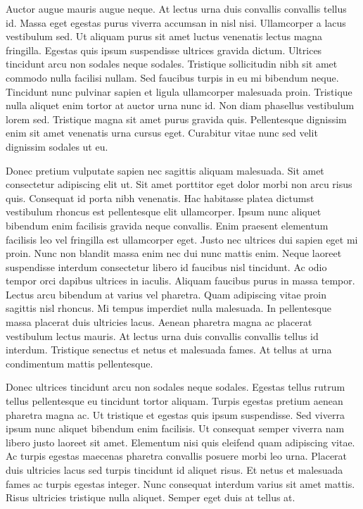 \documentclass[11pt,a4paper]{article}
\begin{document}
Auctor augue mauris augue neque. At lectus urna duis convallis convallis tellus id. Massa eget egestas purus viverra accumsan in nisl nisi. Ullamcorper a lacus vestibulum sed. Ut aliquam purus sit amet luctus venenatis lectus magna fringilla. Egestas quis ipsum suspendisse ultrices gravida dictum. Ultrices tincidunt arcu non sodales neque sodales. Tristique sollicitudin nibh sit amet commodo nulla facilisi nullam. Sed faucibus turpis in eu mi bibendum neque. Tincidunt nunc pulvinar sapien et ligula ullamcorper malesuada proin. Tristique nulla aliquet enim tortor at auctor urna nunc id. Non diam phasellus vestibulum lorem sed. Tristique magna sit amet purus gravida quis. Pellentesque dignissim enim sit amet venenatis urna cursus eget. Curabitur vitae nunc sed velit dignissim sodales ut eu.

Donec pretium vulputate sapien nec sagittis aliquam malesuada. Sit amet consectetur adipiscing elit ut. Sit amet porttitor eget dolor morbi non arcu risus quis. Consequat id porta nibh venenatis. Hac habitasse platea dictumst vestibulum rhoncus est pellentesque elit ullamcorper. Ipsum nunc aliquet bibendum enim facilisis gravida neque convallis. Enim praesent elementum facilisis leo vel fringilla est ullamcorper eget. Justo nec ultrices dui sapien eget mi proin. Nunc non blandit massa enim nec dui nunc mattis enim. Neque laoreet suspendisse interdum consectetur libero id faucibus nisl tincidunt. Ac odio tempor orci dapibus ultrices in iaculis. Aliquam faucibus purus in massa tempor. Lectus arcu bibendum at varius vel pharetra. Quam adipiscing vitae proin sagittis nisl rhoncus. Mi tempus imperdiet nulla malesuada. In pellentesque massa placerat duis ultricies lacus. Aenean pharetra magna ac placerat vestibulum lectus mauris. At lectus urna duis convallis convallis tellus id interdum. Tristique senectus et netus et malesuada fames. At tellus at urna condimentum mattis pellentesque.

Donec ultrices tincidunt arcu non sodales neque sodales. Egestas tellus rutrum tellus pellentesque eu tincidunt tortor aliquam. Turpis egestas pretium aenean pharetra magna ac. Ut tristique et egestas quis ipsum suspendisse. Sed viverra ipsum nunc aliquet bibendum enim facilisis. Ut consequat semper viverra nam libero justo laoreet sit amet. Elementum nisi quis eleifend quam adipiscing vitae. Ac turpis egestas maecenas pharetra convallis posuere morbi leo urna. Placerat duis ultricies lacus sed turpis tincidunt id aliquet risus. Et netus et malesuada fames ac turpis egestas integer. Nunc consequat interdum varius sit amet mattis. Risus ultricies tristique nulla aliquet. Semper eget duis at tellus at.
\end{document}
